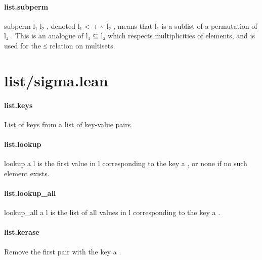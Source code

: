 \documentclass{article}
\begin{document}
\paragraph{list.subperm}
\par
\colorbox[RGB]{253,246,227}{{{{\color[RGB]{101, 123, 131} subperm l₁ l₂ }}}}, denoted 
\colorbox[RGB]{253,246,227}{{{{\color[RGB]{101, 123, 131} l₁  }}}{{{\color[RGB]{181, 137, 0} < }}}{{{\color[RGB]{181, 137, 0} + }}}{{{\color[RGB]{101, 123, 131} \textasciitilde{} l₂ }}}}, means that 
\colorbox[RGB]{253,246,227}{{{{\color[RGB]{101, 123, 131} l₁ }}}} is a sublist of
a permutation of 
\colorbox[RGB]{253,246,227}{{{{\color[RGB]{101, 123, 131} l₂ }}}}. This is an analogue of 
\colorbox[RGB]{253,246,227}{{{{\color[RGB]{101, 123, 131} l₁ ⊆ l₂ }}}} which respects
multiplicities of elements, and is used for the 
\colorbox[RGB]{253,246,227}{{{{\color[RGB]{181, 137, 0} ≤ }}}} relation on multisets.
\section{list/sigma.lean}\paragraph{list.keys}
\par
List of keys from a list of key-value pairs
\paragraph{list.lookup}
\par
\colorbox[RGB]{253,246,227}{{{{\color[RGB]{101, 123, 131} lookup a l }}}} is the first value in 
\colorbox[RGB]{253,246,227}{{{{\color[RGB]{101, 123, 131} l }}}} corresponding to the key 
\colorbox[RGB]{253,246,227}{{{{\color[RGB]{101, 123, 131} a }}}},
or 
\colorbox[RGB]{253,246,227}{{{{\color[RGB]{101, 123, 131} none }}}} if no such element exists.
\paragraph{list.lookup\_all}
\par
\colorbox[RGB]{253,246,227}{{{{\color[RGB]{101, 123, 131} lookup\_all a l }}}} is the list of all values in 
\colorbox[RGB]{253,246,227}{{{{\color[RGB]{101, 123, 131} l }}}} corresponding to the key 
\colorbox[RGB]{253,246,227}{{{{\color[RGB]{101, 123, 131} a }}}}.
\paragraph{list.kerase}
\par
Remove the first pair with the key 
\colorbox[RGB]{253,246,227}{{{{\color[RGB]{101, 123, 131} a }}}}.
\end{document}
